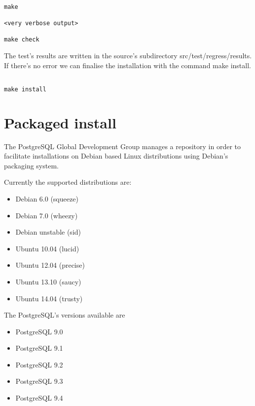 \begin{verbatim}

make

<very verbose output>

make check

\end{verbatim}

The test's results are written in the source's subdirectory
src/test/regress/results. If there's no error we can finalise the installation
with the command make install.

\begin{verbatim}

make install

\end{verbatim}

\section{Packaged install}

\label{sec:DEBIAN_INSTALL}

The PostgreSQL Global Development Group manages a repository in order to
facilitate installations on Debian based Linux distributions using Debian's
packaging system.

Currently the supported distributions are:

\begin{itemize}

    \item Debian 6.0 (squeeze)
    \item Debian 7.0 (wheezy)
    \item Debian unstable (sid)
    \item Ubuntu 10.04 (lucid)
    \item Ubuntu 12.04 (precise)
    \item Ubuntu 13.10 (saucy)
    \item Ubuntu 14.04 (trusty)

\end{itemize}

The PostgreSQL's versions available are

\begin{itemize}

    \item PostgreSQL 9.0
    \item PostgreSQL 9.1
    \item PostgreSQL 9.2
    \item PostgreSQL 9.3
    \item PostgreSQL 9.4

\end{itemize}

